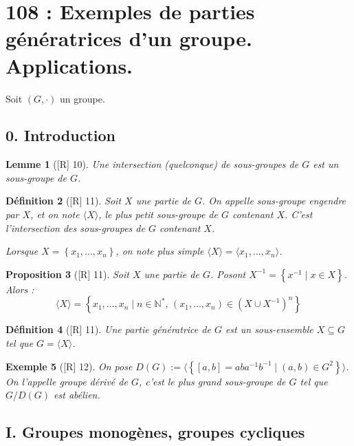 \documentclass[10pt, a4paper, parskip=full, twoside, twocolumn]{report}
\newtheorem{definition}{Définition}
\newtheorem{proposition}[definition]{Proposition}
\newtheorem{lemma}[definition]{Lemme}
\newtheorem{example}[definition]{Exemple}
\newcommand{\IN}{\mathbb{N}}
\begin{document}
\chapter*{108 : Exemples de parties génératrices d'un groupe. Applications.}
\setcounter{definition}{0}
\textcolor{paragraphtext}{Soit $(G,\cdot)$ un groupe.}

\section*{0. Introduction}
\begin{lemma}[\textnormal{[R] 10}]
	Une intersection (quelconque) de sous-groupes de $G$ est un sous-groupe de $G$.
\end{lemma}

\begin{definition}[\textnormal{[R] 11}]
	Soit $X$ une partie de $G$. On appelle \emph{sous-groupe engendre par $X$}, et on note $\langle X\rangle$,
	le plus petit sous-groupe de $G$ contenant $X$. C'est l'intersection des sous-groupes de $G$ contenant $X$.

	Lorsque $X = \left\{x_1,\dots, x_n\right\}$, on note plus simple $\langle X\rangle = \langle x_1,\dots, x_n\rangle$.
\end{definition}

\begin{proposition}[\textnormal{[R] 11}]
	Soit $X$ une partie de $G$. Posont $X^{-1} = \left\{x^{-1}\mid x\in X\right\}$.
	Alors :
	$$\langle X \rangle = \left\{x_1,\dots,x_n\mid n\in\IN^*,\, (x_1,\dots, x_n)\in\left(X\cup X^{-1}\right)^n\right\}$$
\end{proposition}

\begin{definition}[\textnormal{[R] 11}]
	Une \emph{partie génératrice de $G$} est un sous-ensemble $X\subseteq G$ tel que $G = \langle X\rangle$.
\end{definition}

\begin{example}[\textnormal{[R] 12}]
	On pose $D(G) := \langle\left\{[a,b] = aba^{-1}b^{-1}\mid (a,b)\in G^2\right\}\rangle$.
	On l'appelle \emph{groupe dérivé de $G$}, c'est le plus grand sous-groupe de $G$ tel que $G/D(G)$ est abélien.
\end{example}

\section*{I. Groupes monogènes, groupes cycliques}
\end{document}
